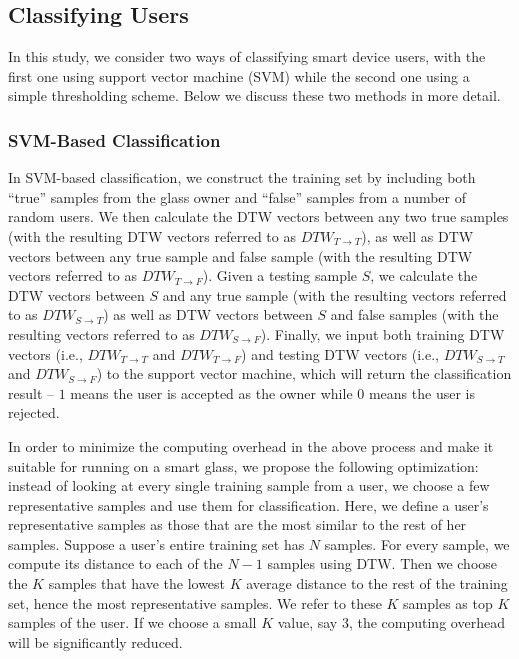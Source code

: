 \subsection{Classifying Users}

In this study, we consider two ways of classifying smart device users, with the first one using support vector machine (SVM) while the second one using a simple thresholding scheme. Below we discuss these two methods in more detail.

\subsubsection{SVM-Based Classification}

In SVM-based classification, we construct the training set by including both ``true'' samples from the glass owner and ``false'' samples from a number of random users. We then calculate the DTW vectors between any two true samples (with the resulting DTW vectors referred to as $DTW_{T\rightarrow T}$), as well as DTW vectors between any true sample and false sample (with the resulting DTW vectors referred to as $DTW_{T\rightarrow F}$). Given a testing sample $S$, we calculate the DTW vectors between $S$ and any true sample (with the resulting vectors referred to as $DTW_{S\rightarrow T}$) as well as DTW vectors between $S$ and false samples (with the resulting vectors referred to as $DTW_{S\rightarrow F}$). Finally, we input both training DTW vectors (i.e., $DTW_{T\rightarrow T}$ and $DTW_{T\rightarrow F}$) and testing DTW vectors (i.e., $DTW_{S\rightarrow T}$ and $DTW_{S\rightarrow F}$) to the support vector machine, which will return the classification result -- $1$ means the user is accepted as the owner while $0$ means the user is rejected.

In order to minimize the computing overhead in the above process and make it suitable for running on a smart glass, we propose the following optimization: instead of looking at every single training sample from a user, we choose a few representative samples and use them for classification. Here, we define a user's representative samples as those that are the most similar to the rest of her samples. Suppose a user's entire training set has $N$ samples. For every sample, we compute its distance to each of the $N-1$ samples using DTW. Then we choose the $K$ samples that have the lowest $K$ average distance to the rest of the training set, hence the most representative samples. We refer to these $K$ samples as top $K$ samples of the user. If we choose a small $K$ value, say 3, the computing overhead will be significantly reduced.



